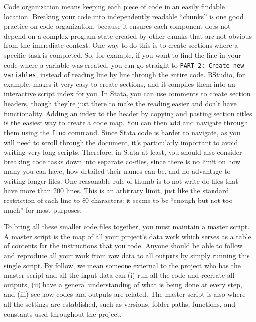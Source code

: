 Code organization means keeping each piece of code in an easily findable location.
Breaking your code into independently readable ``chunks'' is one good practice on code organization,
because it ensures each component does not depend on a complex program state
created by other chunks that are not obvious from the immediate context.
One way to do this is to create sections where a specific task is completed.
So, for example, if you want to find the line in your code where a variable was created,
you can go straight to \texttt{PART 2: Create new variables},
instead of reading line by line through the entire code.
RStudio, for example, makes it very easy to create sections,
and it compiles them into an interactive script index for you.
In Stata, you can use comments to create section headers,
though they're just there to make the reading easier and don't have functionality.
Adding an index to the header by copying and pasting section titles is the easiest way to create a code map.
You can then add and navigate through them using the \texttt{find} command.
Since Stata code is harder to navigate, as you will need to scroll through the document,
it's particularly important to avoid writing very long scripts.
Therefore, in Stata at least, you should also consider breaking code tasks down
into separate do-files, since there is no limit on how many you can have,
how detailed their names can be, and no advantage to writing longer files.
One reasonable rule of thumb is to not write do-files that have more than 200 lines.
This is an arbitrary limit, just like the standard restriction of each line to 80 characters:
it seems to be ``enough but not too much'' for most purposes.

To bring all these smaller code files together, you must maintain a master script.
A master script is the map of all your project's data work
which serves as a table of contents for the instructions that you code.
Anyone should be able to follow and reproduce all your work from
raw data to all outputs by simply running this single script.
By follow, we mean someone external to the project who has the master script and all the input data can
(i) run all the code and recreate all outputs,
(ii) have a general understanding of what is being done at every step, and
(iii) see how codes and outputs are related.
The master script is also where all the settings are established,
such as versions, folder paths, functions, and constants used throughout the project.

